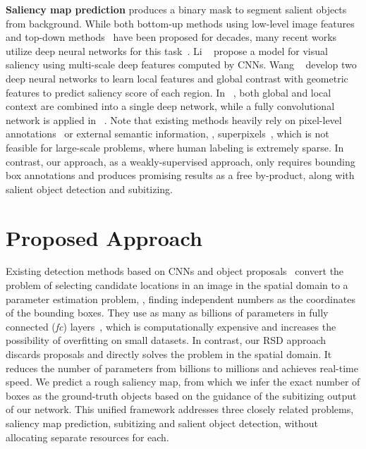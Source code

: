 \documentclass[10pt,twocolumn,letterpaper]{article}
\begin{document}
{\textbf{Saliency map prediction} produces a binary mask to segment salient objects from background. While both bottom-up methods using low-level image features~\cite{perazzi2012saliency,yang2013saliency,yang2013saliency,rc,dsr} and top-down methods~\cite{liu2011learning,DBLP:conf/cvpr/WangWZFZL12} have been proposed for decades, many recent works utilize deep neural networks for this task~\cite{zhao2015saliency,li2015visual,wang2015deep,liu2016dhsnet,DBLP:conf/eccv/WangWLZR16,DBLP:journals/tip/LiZWYWZLW16}. Li \etal~\cite{li2015visual} propose a model for visual saliency using multi-scale deep features computed by CNNs. Wang \etal~\cite{wang2015deep} develop two deep neural networks to learn local features and global contrast with geometric features to predict saliency score of each region. In ~\cite{zhao2015saliency}, both global and local context are combined into a single deep network, while a fully convolutional network is applied in ~\cite{DBLP:conf/eccv/WangWLZR16}. 
Note that existing methods heavily rely on pixel-level annotations~\cite{zhao2015saliency,liu2016dhsnet,DBLP:conf/eccv/WangWLZR16} or external semantic information, \ie, superpixels~\cite{DBLP:journals/tip/LiZWYWZLW16}, which is not feasible for large-scale problems, where human labeling is extremely sparse.
In contrast, our approach, as a weakly-supervised approach, only requires bounding box annotations and produces promising results as a free by-product, along with salient object detection and subitizing.}


\section{Proposed Approach}
Existing detection methods based on CNNs and object proposals~\cite{DBLP:conf/cvpr/ErhanSTA14,DBLP:conf/iccv/Girshick15,DBLP:conf/cvpr/GirshickDDM14,DBLP:conf/nips/RenHGS15,zhang2015SOD} convert the problem of selecting candidate locations in an image in the spatial domain to a parameter estimation problem, \eg, finding independent numbers as the coordinates of the bounding boxes. They use as many as billions of parameters in fully connected (\emph{fc}) layers~\cite{DBLP:conf/iccv/Girshick15,DBLP:conf/cvpr/GirshickDDM14}, which is computationally expensive and increases the possibility of overfitting on small datasets.
%
In contrast, our RSD approach discards proposals and directly solves the problem in the spatial domain. It reduces the number of parameters from billions to millions and achieves real-time speed. We predict a rough saliency map, from which we infer the exact number of boxes as the ground-truth objects based on the guidance of the subitizing output of our network. This unified framework addresses three closely related problems, saliency map prediction, subitizing and salient object detection, without allocating separate resources for each.
\end{document}
